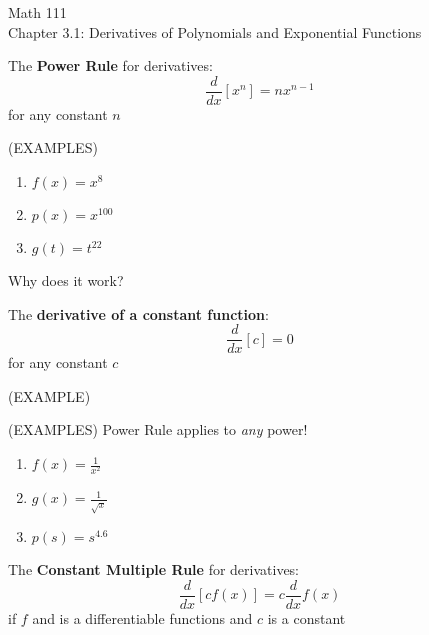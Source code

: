 \documentclass[11pt]{article}
\begin{document}
\begin{center}
\Large
\rm{Math 111}
\\
\rm{Chapter 3.1:  Derivatives of Polynomials and Exponential Functions}
\\
\end{center}
\vspace{0.2in}

The {\bf Power Rule } for derivatives:
\begin{displaymath}
\frac{d}{dx}\left[x^n  \right] = nx^{n-1}
  \end{displaymath}
for any constant $n$

\vspace{0.5in}

  (EXAMPLES)
\begin{enumerate}
\item{$f(x) = x^8$}
  \vspace{0.2in}
\item{$p(x) = x^{100}$}
    \vspace{0.2in}
\item{$g(t) = t^{22}$}
  \end{enumerate}

Why does it work?  

\vspace{2.5in}

The {\bf derivative of a constant function}:
\begin{displaymath}
\frac{d}{dx}\left[c  \right] = 0
  \end{displaymath}
for any constant $c$

\vspace{0.1in}

(EXAMPLE)

\pagebreak

  (EXAMPLES)  Power Rule applies to \emph{any} power!

\begin{enumerate}
\item{$f(x) = \frac{1}{x^2}$}
  \vspace{0.3in}
\item{$g(x) = \frac{1}{\sqrt{x}}$}
  \vspace{0.3in}
\item{$p(s) = s^{4.6}$}
  \vspace{0.3in}
\end{enumerate}

The {\bf Constant Multiple Rule} for derivatives:
\begin{displaymath}
\frac{d}{dx}\left[cf(x)   \right] = c\frac{d}{dx}f(x)
  \end{displaymath}
if $f$ and is a differentiable functions and $c$ is a constant
\end{document}
